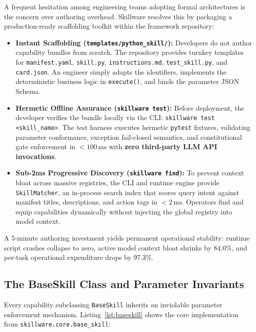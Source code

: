 \begin{tcolorbox}[protocolbox, title={DEVELOPER ERGONOMICS: THE 5-MINUTE CAPABILITY BUNDLE}]
\small
A frequent hesitation among engineering teams adopting formal architectures is the concern over authoring overhead. Skillware resolves this by packaging a production-ready scaffolding toolkit within the framework repository:
\begin{itemize}[leftmargin=*]
  \item \textbf{Instant Scaffolding (\texttt{templates/python\_skill/}):} Developers do not author capability bundles from scratch. The repository provides turnkey templates for \texttt{manifest.yaml}, \texttt{skill.py}, \texttt{instructions.md}, \texttt{test\_skill.py}, and \texttt{card.json}. An engineer simply adapts the identifiers, implements the deterministic business logic in \texttt{execute()}, and binds the parameter JSON Schema.
  \item \textbf{Hermetic Offline Assurance (\texttt{skillware test}):} Before deployment, the developer verifies the bundle locally via the CLI: \texttt{skillware test <skill\_name>}. The test harness executes hermetic \texttt{pytest} fixtures, validating parameter conformance, exception fail-closed semantics, and constitutional gate enforcement in $<100\,\text{ms}$ with \textbf{zero third-party LLM API invocations}.
  \item \textbf{Sub-2ms Progressive Discovery (\texttt{skillware find}):} To prevent context bloat across massive registries, the CLI and runtime engine provide \texttt{SkillMatcher}, an in-process search index that scores query intent against manifest titles, descriptions, and action tags in $<2\,\text{ms}$. Operators find and equip capabilities dynamically without injecting the global registry into model context.
\end{itemize}
A 5-minute authoring investment yields permanent operational stability: runtime script crashes collapse to zero, active model context bloat shrinks by $84.0\%$, and per-task operational expenditure drops by $97.3\%$.
\end{tcolorbox}

\subsection{The BaseSkill Class and Parameter Invariants}
\label{subsec:baseskill_contract}

Every capability subclassing \texttt{BaseSkill} inherits an inviolable parameter enforcement mechanism. Listing~\ref{lst:baseskill} shows the core implementation from \texttt{skillware.core.\allowbreak base\_skill}:


